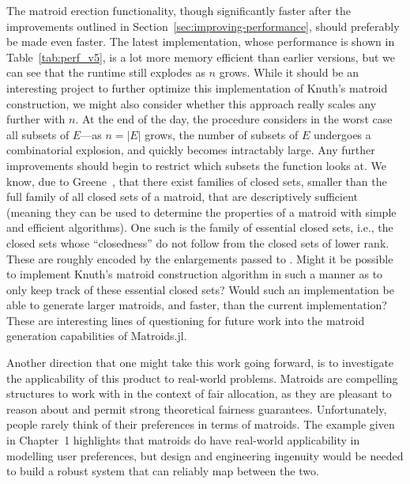 The matroid erection functionality, though significantly faster after the improvements outlined in Section~\ref{sec:improving-performance}, should preferably be made even faster. The latest implementation, whose performance is shown in Table~\ref{tab:perf_v5}, is a lot more memory efficient than earlier versions, but we can see that the runtime still explodes as $n$ grows. While it should be an interesting project to further optimize this implementation of Knuth's matroid construction, we might also consider whether this approach really scales any further with $n$. At the end of the day, the procedure considers in the worst case all subsets of $E$---as $n=|E|$ grows, the number of subsets of $E$ undergoes a combinatorial explosion, and quickly becomes intractably large. Any further improvements should begin to restrict which subsets the function looks at. We know, due to Greene~\cite{greene-1991}, that there exist families of closed sets, smaller than the full family of all closed sets of a matroid, that are descriptively sufficient (meaning they can be used to determine the properties of a matroid with simple and efficient algorithms). One such is the family of essential closed sets, i.e., the closed sets whose ``closedness'' do not follow from the closed sets of lower rank. These are roughly encoded by the enlargements passed to . Might it be possible to implement Knuth's matroid construction algorithm in such a manner as to only keep track of these essential closed sets? Would such an implementation be able to generate larger matroids, and faster, than the current implementation? These are interesting lines of questioning for future work into the matroid generation capabilities of Matroids.jl.

Another direction that one might take this work going forward, is to investigate the applicability of this product to real-world problems. Matroids are compelling structures to work with in the context of fair allocation, as they are pleasant to reason about and permit strong theoretical fairness guarantees. Unfortunately, people rarely think of their preferences in terms of matroids. The example given in Chapter~1 highlights that matroids do have real-world applicability in modelling user preferences, but design and engineering ingenuity would be needed to build a robust system that can reliably map between the two.


